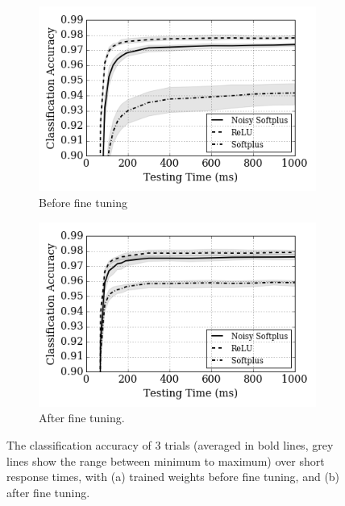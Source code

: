 		
	\begin{figure}[htb!]
		\centering
		\begin{subfigure}[t]{0.49\textwidth}
			\includegraphics[width=\textwidth]{pics_iconip/8-2.png}
		    \caption{Before fine tuning}
		\end{subfigure}
		\begin{subfigure}[t]{0.49\textwidth}
			\includegraphics[width=\textwidth]{pics_iconip/8-3.png}
		    \caption{After fine tuning.}
		\end{subfigure}

		\caption{The classification accuracy of 3 trials (averaged in bold lines, grey lines show the range between minimum to maximum) over short response times, with (a) trained weights before fine tuning, and (b) after fine tuning.}
		\label{fig:ca_time}	
	\end{figure}
	
